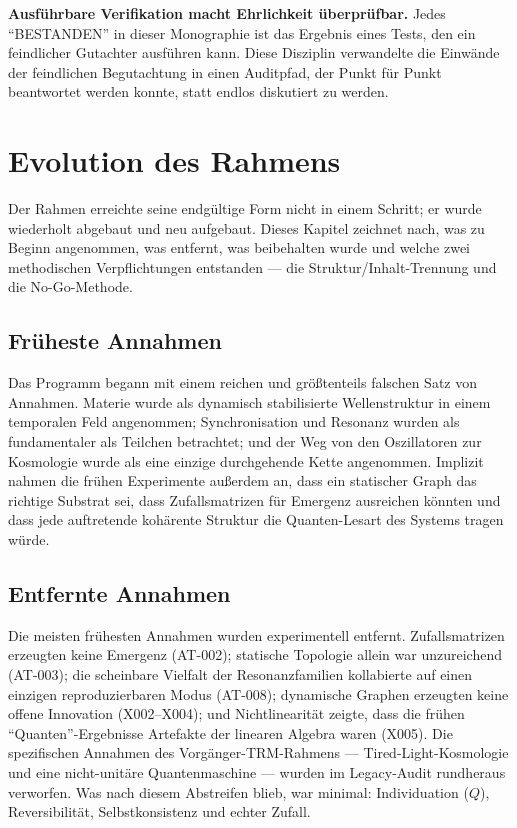 \documentclass[10pt,twoside,openany]{book}
\begin{document}
\textbf{Ausführbare Verifikation macht Ehrlichkeit überprüfbar.} Jedes ``BESTANDEN'' in
dieser Monographie ist das Ergebnis eines Tests, den ein feindlicher Gutachter ausführen
kann.
Diese Disziplin verwandelte die Einwände der feindlichen Begutachtung in einen
Auditpfad, der Punkt für Punkt beantwortet werden konnte, statt endlos diskutiert zu
werden.

\chapter{Evolution des Rahmens}
\label{ch:evolution}

Der Rahmen erreichte seine endgültige Form nicht in einem Schritt; er wurde wiederholt
abgebaut und neu aufgebaut. Dieses Kapitel zeichnet nach, was zu Beginn angenommen, was
entfernt, was beibehalten wurde und welche zwei methodischen Verpflichtungen entstanden
--- die Struktur/Inhalt-Trennung und die No-Go-Methode.

\section{Früheste Annahmen}

Das Programm begann mit einem reichen und größtenteils falschen Satz von Annahmen. Materie
wurde als dynamisch stabilisierte Wellenstruktur in einem temporalen Feld angenommen;
Synchronisation und Resonanz wurden als fundamentaler als Teilchen betrachtet; und der Weg
von den Oszillatoren zur Kosmologie wurde als eine einzige durchgehende Kette angenommen.
Implizit nahmen die frühen Experimente außerdem an, dass ein statischer Graph das richtige
Substrat sei, dass Zufallsmatrizen für Emergenz ausreichen könnten und dass jede
auftretende kohärente Struktur die Quanten-Lesart des Systems tragen würde.

\section{Entfernte Annahmen}

Die meisten frühesten Annahmen wurden experimentell entfernt. Zufallsmatrizen erzeugten
keine Emergenz (AT-002); statische Topologie allein war unzureichend (AT-003); die
scheinbare Vielfalt der Resonanzfamilien kollabierte auf einen einzigen reproduzierbaren
Modus (AT-008); dynamische Graphen erzeugten keine offene Innovation (X002--X004); und
Nichtlinearität zeigte, dass die frühen ``Quanten''-Ergebnisse Artefakte der linearen
Algebra waren (X005). Die spezifischen Annahmen des Vorgänger-TRM-Rahmens ---
Tired-Light-Kosmologie und eine nicht-unitäre Quantenmaschine --- wurden im
Legacy-Audit rundheraus verworfen. Was nach diesem Abstreifen blieb, war minimal:
Individuation ($Q$), Reversibilität, Selbstkonsistenz und echter Zufall.
\end{document}
